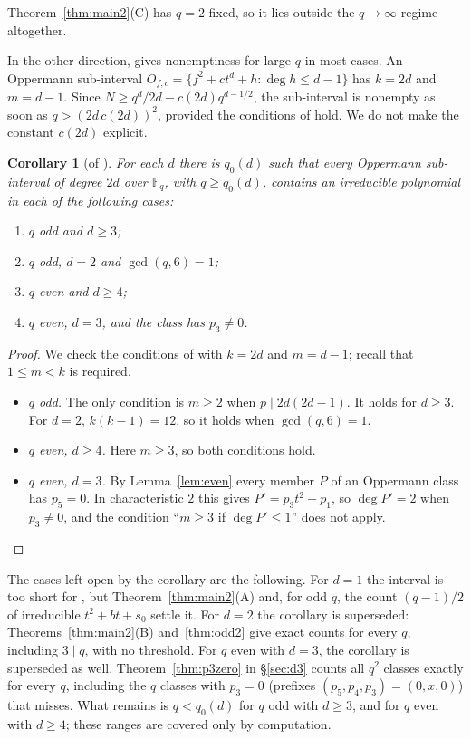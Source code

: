 \documentclass[11pt,a4paper]{amsart}
\newtheorem{corollary}[theorem]{Corollary}
\theoremstyle{definition}
\theoremstyle{remark}
\newcommand{\F}{\mathbb{F}}
\begin{document}
Theorem~\ref{thm:main2}(C) has $q=2$ fixed, so it lies outside the $q\to\infty$ regime altogether.

In the other direction, \cite{BBR} gives nonemptiness for large $q$ in most cases. An Oppermann sub-interval
$O_{f,c}=\{f^2+ct^d+h:\deg h\le d-1\}$ has $k=2d$ and $m=d-1$. Since $N\ge q^d/2d-c(2d)q^{d-1/2}$, the
sub-interval is nonempty as soon as $q>(2d\,c(2d))^2$, provided the conditions of \cite{BBR} hold. We do not make the
constant $c(2d)$ explicit.

\begin{corollary}[of \cite{BBR}]\label{cor:BBR}
For each $d$ there is $q_0(d)$ such that every Oppermann sub-interval of degree $2d$ over $\F_q$, with $q\ge q_0(d)$,
contains an irreducible polynomial in each of the following cases:
\begin{enumerate}
\item $q$ odd and $d\ge3$;
\item $q$ odd, $d=2$ and $\gcd(q,6)=1$;
\item $q$ even and $d\ge4$;
\item $q$ even, $d=3$, and the class has $p_3\ne0$.
\end{enumerate}
\end{corollary}

\begin{proof}
We check the conditions of \cite{BBR} with $k=2d$ and $m=d-1$; recall that $1\le m<k$ is required.
\begin{itemize}
\item \emph{$q$ odd.} The only condition is $m\ge2$ when $p\mid 2d(2d-1)$. It holds for $d\ge3$. For $d=2$,
$k(k-1)=12$, so it holds when $\gcd(q,6)=1$.
\item \emph{$q$ even, $d\ge4$.} Here $m\ge3$, so both conditions hold.
\item \emph{$q$ even, $d=3$.} By Lemma~\ref{lem:even} every member $P$ of an Oppermann class has $p_5=0$. In
characteristic $2$ this gives $P'=p_3t^2+p_1$, so $\deg P'=2$ when $p_3\ne0$, and the condition ``$m\ge3$ if
$\deg P'\le1$'' does not apply.
\end{itemize}
\end{proof}

The cases left open by the corollary are the following. For $d=1$ the interval is too short for \cite{BBR}, but
Theorem~\ref{thm:main2}(A) and, for odd $q$, the count $(q-1)/2$ of irreducible $t^2+bt+s_0$ settle it. For $d=2$ the
corollary is superseded: Theorems~\ref{thm:main2}(B) and~\ref{thm:odd2} give exact counts for every $q$, including
$3\mid q$, with no threshold.
For $q$ even with $d=3$, the corollary is superseded as well. Theorem~\ref{thm:p3zero} in \S\ref{sec:d3}
counts all $q^2$ classes exactly for every $q$, including the $q$ classes with $p_3=0$ (prefixes
$(p_5,p_4,p_3)=(0,x,0)$) that \cite{BBR} misses. What remains is $q<q_0(d)$ for $q$ odd with $d\ge3$, and for $q$ even
with $d\ge4$; these ranges are covered only by computation.
\end{document}
